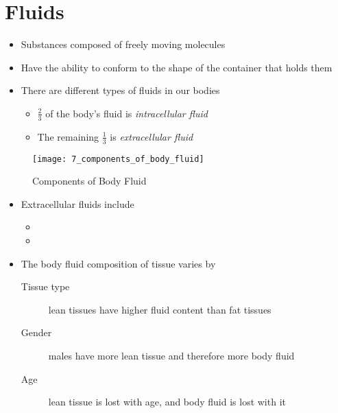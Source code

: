 \documentclass[title={Chapter 7}]{fdsn201notes}
\begin{document}
\maketitle
\setcounter{chapter}{7}

\section{Fluids}\label{sec:fluids}
\begin{itemize}
	\item Substances composed of freely moving molecules
	\item Have the ability to conform to the shape of the container that holds them
	\item There are different types of fluids in our bodies
	\begin{itemize}
		\item $\frac{2}{3}$ of the body's fluid is \emph{intracellular fluid}
		\item The remaining $\frac{1}{3}$ is \emph{extracellular fluid}
	\end{itemize}
\end{itemize}

\begin{figure}[H]
	\centering
	\texttt{[image: 7\_components\_of\_body\_fluid]}
	\caption{Components of Body Fluid}
	\label{fig:components_of_body_fluid}
\end{figure}

\begin{itemize}
	\item Extracellular fluids include
	\begin{itemize}
		\item {}
		\item {}
	\end{itemize}
	\item The body fluid composition of tissue varies by
	\begin{description}
		\item[Tissue type] lean tissues have higher fluid content than fat tissues
		\item[Gender] males have more lean tissue and therefore more body fluid
		\item[Age] lean tissue is lost with age, and body fluid is lost with it
	\end{description}
\end{itemize}
\end{document}
